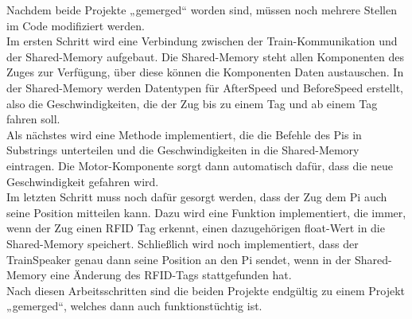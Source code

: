 Nachdem beide Projekte „gemerged“ worden sind, müssen noch mehrere Stellen im Code modifiziert werden.\\
Im ersten Schritt wird eine Verbindung zwischen der Train-Kommunikation und der Shared-Memory aufgebaut. Die Shared-Memory steht allen Komponenten des Zuges zur Verfügung, über diese können die Komponenten Daten austauschen. In der Shared-Memory werden Datentypen für AfterSpeed und BeforeSpeed erstellt, also die Geschwindigkeiten, die der Zug bis zu einem Tag und ab einem Tag fahren soll.\\
Als nächstes wird eine Methode implementiert, die die Befehle des Pis in Substrings unterteilen und die Geschwindigkeiten in die Shared-Memory eintragen. Die Motor-Komponente sorgt dann automatisch dafür, dass die neue Geschwindigkeit gefahren wird.\\
Im letzten Schritt muss noch dafür gesorgt werden, dass der Zug dem Pi auch seine Position mitteilen kann. Dazu wird eine Funktion implementiert, die immer, wenn der Zug einen RFID Tag erkennt, einen dazugehörigen float-Wert in die Shared-Memory speichert. Schließlich wird noch implementiert, dass der TrainSpeaker genau dann seine Position an den Pi sendet, wenn in der Shared-Memory eine Änderung des RFID-Tags stattgefunden hat.\\
Nach diesen Arbeitsschritten sind die beiden Projekte endgültig  zu einem Projekt „gemerged“, welches dann auch funktionstüchtig ist.
